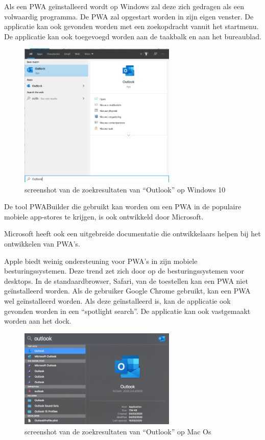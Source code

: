 	Als een PWA geïnstalleerd wordt op Windows zal deze zich gedragen als een volwaardig programma. De PWA zal opgestart worden in zijn eigen venster. De applicatie kan ook gevonden worden met een zoekopdracht vanuit het startmenu. De applicatie kan ook toegevoegd worden aan de taakbalk en aan het bureaublad.
	
	\begin{figure}[H]
		\centering
		\includegraphics[width=75mm]{./img/Outlook_search_windows.png}
		\caption{screenshot van de zoekresultaten van “Outlook” op Windows 10}
	\end{figure}
	
	
	De tool PWABuilder die gebruikt kan worden om een PWA in de populaire mobiele app-stores te krijgen, is ook ontwikkeld door Microsoft.
	\autocite{PWAbuilder2020}
	
	Microsoft heeft ook een uitgebreide documentatie die ontwikkelaars helpen bij het ontwikkelen van PWA's.
	\autocite{Microsoft2020b}
	
	
	Apple biedt weinig ondersteuning voor PWA's in zijn mobiele besturingssystemen. Deze trend zet zich door op de besturingssystemen voor desktops. In de standaardbrowser, Safari, van de toestellen kan een PWA niet geïnstalleerd worden. Als de gebruiker Google Chrome gebruikt, kan een PWA wel geïnstalleerd worden. Als deze geïnstalleerd is, kan de applicatie ook gevonden worden in een “spotlight search”. De applicatie kan ook vastgemaakt worden aan het dock.
	
	\begin{figure}[H]
		\centering
		\includegraphics[width=75mm]{./img/Outlook_search_mac.png}
		\caption{screenshot van de zoekresultaten van “Outlook” op Mac Os}
	\end{figure}
	
